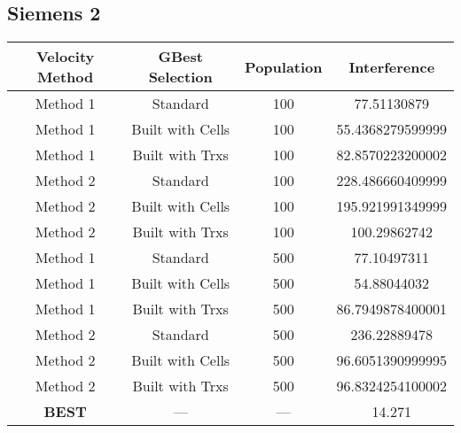 \subsection{Siemens 2}
\begin{center}
	\begin{tabular}{| c | c | c | c |}
	\hline
	Velocity Method & GBest Selection & Population & Interference\\ \hline
	Method 1 & Standard & 100 & 77.51130879\\ \hline
	Method 1 & Built with Cells & 100 & 55.4368279599999\\ \hline
	Method 1 & Built with Trxs & 100 & 82.8570223200002\\ \hline
	Method 2 & Standard & 100 & 228.486660409999\\ \hline
	Method 2 & Built with Cells & 100 & 195.921991349999\\ \hline
	Method 2 & Built with Trxs & 100 & 100.29862742\\ \hline
	Method 1 & Standard & 500 & 77.10497311\\ \hline
	Method 1 & Built with Cells & 500 & 54.88044032\\ \hline
	Method 1 & Built with Trxs & 500 & 86.7949878400001\\ \hline
	Method 2 & Standard & 500 & 236.22889478\\ \hline
	Method 2 & Built with Cells & 500 & 96.6051390999995\\ \hline
	Method 2 & Built with Trxs & 500 & 96.8324254100002\\ \hline
	\textbf{BEST} & --- & --- & 14.271\\ \hline
	\end{tabular}
\end{center}
